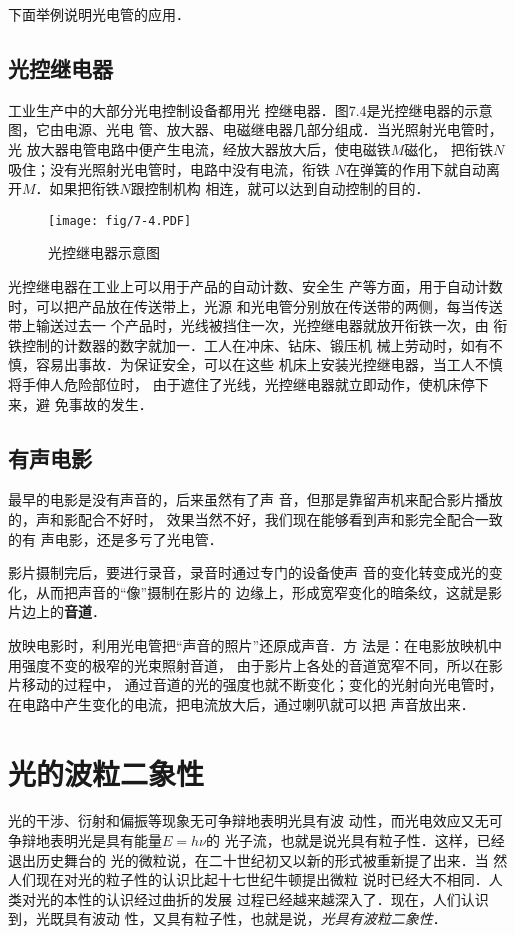 下面举例说明光电管的应用．

\subsection{光控继电器}

工业生产中的大部分光电控制设备都用光
控继电器．图7.4是光控继电器的示意图，它由电源、光电
管、放大器、电磁继电器几部分组成．当光照射光电管时，光
放大器电管电路中便产生电流，经放大器放大后，使电磁铁$M$磁化，
把衔铁$N$吸住；没有光照射光电管时，电路中没有电流，衔铁
$N$在弹簧的作用下就自动离开$M$．如果把衔铁$N$跟控制机构
相连，就可以达到自动控制的目的．
\begin{figure}[htp]\centering
    \texttt{[image: fig/7-4.PDF]}
    \caption{光控继电器示意图}
    \end{figure}


光控继电器在工业上可以用于产品的自动计数、安全生
产等方面，用于自动计数时，可以把产品放在传送带上，光源
和光电管分别放在传送带的两侧，每当传送带上输送过去一
个产品时，光线被挡住一次，光控继电器就放开衔铁一次，由
衔铁控制的计数器的数字就加一．工人在冲床、钻床、锻压机
械上劳动时，如有不慎，容易出事故．为保证安全，可以在这些
机床上安装光控继电器，当工人不慎将手伸人危险部位时，
由于遮住了光线，光控继电器就立即动作，使机床停下来，避
免事故的发生．


\subsection{有声电影}

最早的电影是没有声音的，后来虽然有了声
音，但那是靠留声机来配合影片播放的，声和影配合不好时，
效果当然不好，我们现在能够看到声和影完全配合一致的有
声电影，还是多亏了光电管．

影片摄制完后，要进行录音，录音时通过专门的设备使声
音的变化转变成光的变化，从而把声音的“像”摄制在影片的
边缘上，形成宽窄变化的暗条纹，这就是影片边上的\textbf{音道}．

放映电影时，利用光电管把“声音的照片”还原成声音．方
法是：在电影放映机中用强度不变的极窄的光束照射音道，
由于影片上各处的音道宽窄不同，所以在影片移动的过程中，
通过音道的光的强度也就不断变化；变化的光射向光电管时，
在电路中产生变化的电流，把电流放大后，通过喇叭就可以把
声音放出来．

\section{光的波粒二象性}
光的干涉、衍射和偏振等现象无可争辩地表明光具有波
动性，而光电效应又无可争辩地表明光是具有能量$E=h\nu$的
光子流，也就是说光具有粒子性．这样，已经退出历史舞台的
光的微粒说，在二十世纪初又以新的形式被重新提了出来．当
然人们现在对光的粒子性的认识比起十七世纪牛顿提出微粒
说时已经大不相同．人类对光的本性的认识经过曲折的发展
过程已经越来越深入了．现在，人们认识到，光既具有波动
性，又具有粒子性，也就是说，\textit{光具有波粒二象性}．

